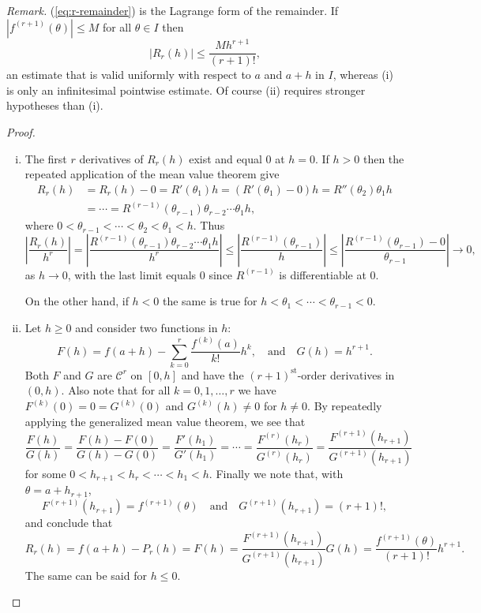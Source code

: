\noindent\textit{Remark.} (\ref{eq:r-remainder}) is the \textsf{Lagrange form} of the remainder.
If $|f^{(r+1)}(\theta)| \leqslant M$ for all $\theta \in I$ then
\[
  |R_r(h)| \leqslant \frac{ M h^{r+1} }{(r+1)!},
\]
an estimate that is valid uniformly with respect to $a$ and $a+h$ in $I$, whereas (i) is only an infinitesimal pointwise estimate.
Of course (ii) requires stronger hypotheses than (i).

\begin{proof}
  \begin{enumerate}[(i)]
    \item The first $r$ derivatives of $R_r(h)$ exist and equal $0$ at $h = 0$.
      If $h > 0$ then the repeated application of the mean value theorem give
      \begin{align*}
	R_r(h) &= R_r(h) - 0 = R'(\theta_1) h = (R'(\theta_1)-0) h = R''(\theta_2) \theta_1 h \\
	&= \cdots = R^{(r-1)}(\theta_{r-1}) \theta_{r-2} \cdots \theta_1 h,
      \end{align*}
      where $0 < \theta_{r-1} < \cdots < \theta_2 < \theta_1 < h$.
      Thus
      \[
	\left| \frac{R_r(h)}{h^r} \right|
	= \left| \frac{ R^{(r-1)}(\theta_{r-1}) \theta_{r-2} \cdots \theta_1 h }{ h^r } \right|
	\leqslant \left| \frac{ R^{(r-1)}(\theta_{r-1}) }{h} \right|
	\leqslant \left| \frac{ R^{(r-1)}(\theta_{r-1}) - 0 }{\theta_{r-1}}
	\right| \to 0,
      \]
      as $h \to 0$, with the last limit equals $0$ since $R^{(r-1)}$ is differentiable at $0$.

      On the other hand, if $h < 0$ the same is true for $h < \theta_1 < \cdots < \theta_{r-1} < 0$.
      
    \item Let $h \geqslant 0$ and consider two functions in $h$:
      \[
	F(h) = f(a+h) - \sum_{k=0}^r \frac{ f^{(k)}(a) }{k!} h^k, \quad
	\text{and} \quad
	G(h) = h^{r+1}.
      \]
      Both $F$ and $G$ are $\mathcal{C}^r$ on $[0,h]$ and have the $(r+1)^{\text{st}}$-order derivatives in $(0,h)$.
      Also note that for all $k=0,1,\dots,r$ we have $F^{(k)}(0) = 0 = G^{(k)}(0)$ and $G^{(k)}(h) \ne 0$ for $h \ne 0$. 
      By repeatedly applying the generalized mean value theorem, we see that
      \[
	\frac{F(h)}{G(h)} = \frac{F(h)-F(0)}{G(h)-G(0)} = \frac{F'(h_1)}{G'(h_1)} = \cdots = \frac{F^{(r)}(h_r)}{G^{(r)}(h_r)} = \frac{F^{(r+1)}(h_{r+1})}{G^{(r+1)}(h_{r+1})}
      \]
      for some $0 < h_{r+1} < h_r < \cdots < h_1 < h$.
      Finally we note that, with $\theta = a + h_{r+1}$,
      \[
	F^{(r+1)}(h_{r+1}) = f^{(r+1)}(\theta) \quad \text{and} \quad
	G^{(r+1)}(h_{r+1}) = (r+1)!,
      \]
      and conclude that
      \[
	R_r(h) = f(a+h) - P_r(h) = F(h) = \frac{F^{(r+1)}(h_{r+1})}{G^{(r+1)}(h_{r+1})} G(h) = \frac{f^{(r+1)}(\theta)}{(r+1)!} h^{r+1}.
      \]
      The same can be said for $h \leqslant 0$.
  \end{enumerate}
\end{proof}

